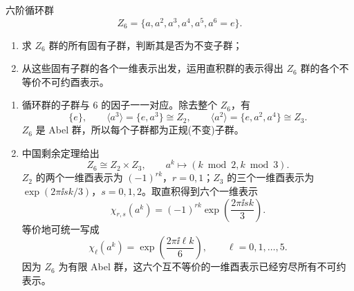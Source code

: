 \begin{question}[20 分]
六阶循环群
\[
Z_6=\{a,a^2,a^3,a^4,a^5,a^6=e\}.
\]
\begin{enumerate}
  \item 求 $Z_6$ 群的所有固有子群，判断其是否为不变子群；
  \item 从这些固有子群的各个一维表示出发，运用直积群的表示得出 $Z_6$ 群的各个不等价不可约酉表示。
\end{enumerate}
\begin{solution}
\begin{enumerate}
  \item 循环群的子群与 $6$ 的因子一一对应。除去整个 $Z_6$，有
  \[
  \{e\},\qquad
  \langle a^3\rangle=\{e,a^3\}\cong Z_2,\qquad
  \langle a^2\rangle=\{e,a^2,a^4\}\cong Z_3.
  \]
  $Z_6$ 是 Abel 群，所以每个子群都为正规(不变)子群。

  \item 中国剩余定理给出
  \[
  Z_6\cong Z_2\times Z_3,
  \qquad a^k\longmapsto (k\bmod2,k\bmod3).
  \]
  $Z_2$ 的两个一维酉表示为 $(-1)^{rk}$，$r=0,1$；$Z_3$ 的三个一维酉表示为
  $\exp(2\pi \ii s k/3)$，$s=0,1,2$。取直积得到六个一维表示
  \[
  \chi_{r,s}(a^k)=(-1)^{rk}\exp\!\left(\frac{2\pi\ii sk}{3}\right).
  \]
  等价地可统一写成
  \[
  \boxed{\chi_\ell(a^k)=\exp\!\left(\frac{2\pi\ii\ell k}{6}\right)},
  \qquad \ell=0,1,\ldots,5.
  \]
  因为 $Z_6$ 为有限 Abel 群，这六个互不等价的一维酉表示已经穷尽所有不可约表示。
\end{enumerate}
\end{solution}
\end{question}

